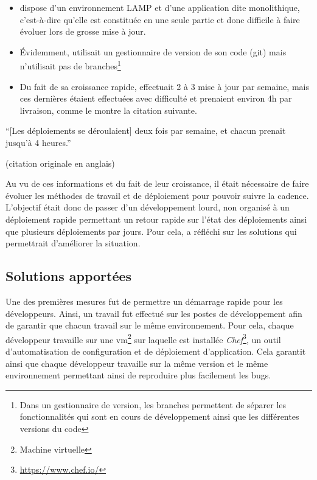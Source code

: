 \begin{itemize}
	\item \etsy{} dispose d'un environnement \gls{LAMP} et d'une application dite monolithique, c'est-à-dire qu'elle est constituée en une seule partie et donc difficile à faire évoluer lors de grosse mise à jour.
	\item Évidemment, \etsy{} utilisait un gestionnaire de version de son code (\gls{git}) mais n'utilisait pas de branches\footnote{Dans un gestionnaire de version, les branches permettent de séparer les fonctionnalités qui sont en cours de développement ainsi que les différentes versions du code}
	\item Du fait de sa croissance rapide, \etsy{} effectuait 2 à 3 mise à jour par semaine, mais ces dernières étaient effectuées avec difficulté et prenaient environ 4h par livraison, comme le montre la citation suivante. 
\end{itemize}

\epigraph{``[Les déploiements se déroulaient] deux fois par semaine, et chacun prenait jusqu'à 4 heures.''}{ \cite{etsyInterview} (citation originale en anglais)}

Au vu de ces informations et du fait de leur croissance, il était nécessaire de faire évoluer les méthodes de travail et de déploiement pour pouvoir suivre la cadence. L'objectif était donc de passer d'un développement lourd, non organisé à un déploiement rapide permettant un retour rapide sur l'état des déploiements ainsi que plusieurs déploiements par jours. Pour cela, \etsy{} a réfléchi sur les solutions qui permettrait d'améliorer la situation. 

\subsection{Solutions apportées}

Une des premières mesures fut de permettre un démarrage rapide pour les développeurs. Ainsi, un travail fut effectué sur les postes de développement afin de garantir que chacun travail sur le même environnement. Pour cela, chaque développeur travaille sur une \gls{vm}\footnote{Machine virtuelle} sur laquelle est installée \emph{Chef}\footnote{\url{https://www.chef.io/}}, un outil d'automatisation de configuration et de déploiement d'application. Cela garantit ainsi que chaque développeur travaille sur la même version et le même environnement permettant ainsi de reproduire plus facilement les bugs. 

